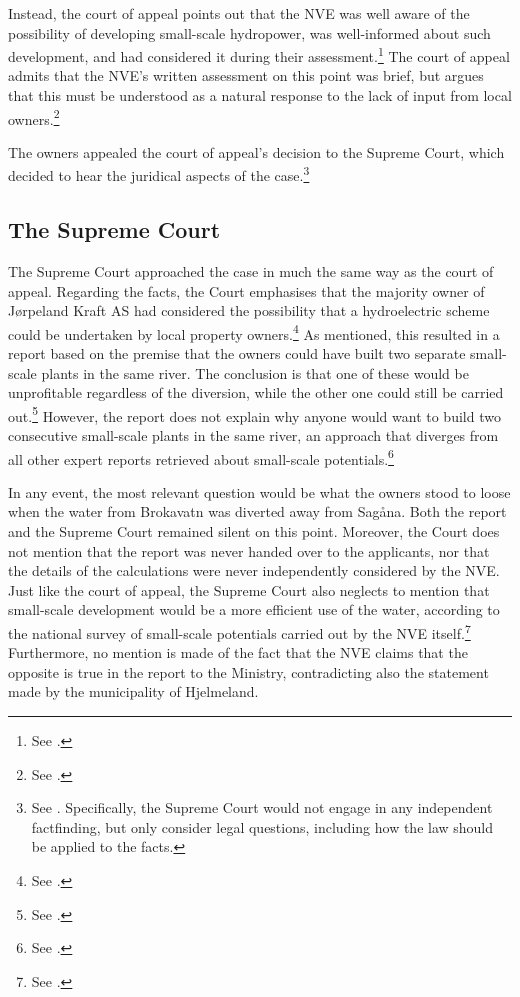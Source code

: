 Instead, the court of appeal points out that the NVE was well aware of the possibility of developing small-scale hydropower, was well-informed about such development, and had considered it during their assessment.\footnote{See \cite[9]{jorpeland11a}.} The court of appeal admits that the NVE's written assessment on this point was brief, but argues that this must be understood as a natural response to the lack of input from local owners.\footnote{See \cite[9]{jorpeland11a}.}

The owners appealed the court of appeal's decision to the Supreme Court, which decided to hear the  juridical aspects of the case.\footnote{See \cite[8]{jorpeland11}. Specifically, the Supreme Court would not engage in any independent factfinding, but only consider legal questions, including how the law should be applied to the facts.}

\subsection{The Supreme Court}

The Supreme Court approached the case in much the same way as the court of appeal. Regarding the facts, the Court emphasises that the majority owner of Jørpeland Kraft AS had considered the possibility that a hydroelectric scheme could be undertaken by local property owners.\footnote{See \cite[53]{jorpeland11}.} As mentioned, this resulted in a report based on the premise that the owners could have built two separate small-scale plants in the same river. The conclusion is that one of these would be unprofitable regardless of the diversion, while the other one could still be carried out.\footnote{See \cite[23]{jorpeland09}.} However, the report does not explain why anyone would want to build two consecutive small-scale plants in the same river, an approach that diverges from all other expert reports retrieved about small-scale potentials.\footnote{See \cite[16|23]{jorpeland09}.}

In any event, the most relevant question would be what the owners stood to loose when the water from Brokavatn was diverted away from Sagåna. Both the report and the Supreme Court remained silent on this point. Moreover, the Court does not mention that the report was never handed over to the applicants, nor that the details of the calculations were never independently considered by the NVE. Just like the court of appeal, the Supreme Court also neglects to mention that small-scale development would be a more efficient use of the water, according to the national survey of small-scale potentials carried out by the NVE itself.\footnote{See \cite[16]{jorpeland09}.} Furthermore, no mention is made of the fact that the NVE claims that the opposite is true in the report to the Ministry, contradicting also the statement made by the municipality of Hjelmeland.

